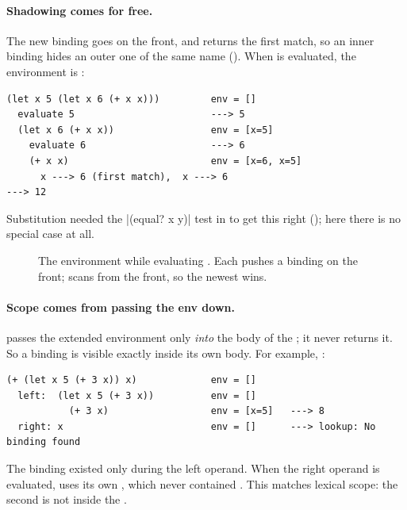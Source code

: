 \paragraph{Shadowing comes for free.} The new binding goes on the front, and  returns the first match, so an inner binding hides an outer one of the same name (). When  is evaluated, the environment is :
\begin{lstlisting}[style=repl]
(let x 5 (let x 6 (+ x x)))         env = []
  evaluate 5                        ---> 5
  (let x 6 (+ x x))                 env = [x=5]
    evaluate 6                      ---> 6
    (+ x x)                         env = [x=6, x=5]
      x ---> 6 (first match),  x ---> 6
---> 12
\end{lstlisting}
Substitution needed the \rkt|(equal? x y)| test in  to get this right (); here there is no special case at all.

\begin{figure}[htbp]
\centering
{}
\caption{The environment while evaluating . Each  pushes a binding on the front;  scans from the front, so the newest  wins.}
\label{fig:envstack}
\end{figure}

\paragraph{Scope comes from passing the env down.}  passes the extended environment only \emph{into} the body of the ; it never returns it. So a binding is visible exactly inside its own body. For example, :
\begin{lstlisting}[style=repl]
(+ (let x 5 (+ 3 x)) x)             env = []
  left:  (let x 5 (+ 3 x))          env = []
           (+ 3 x)                  env = [x=5]   ---> 8
  right: x                          env = []      ---> lookup: No binding found
\end{lstlisting}
The  binding existed only during the left operand. When the right operand is evaluated,  uses its own , which never contained . This matches lexical scope: the second  is not inside the .

